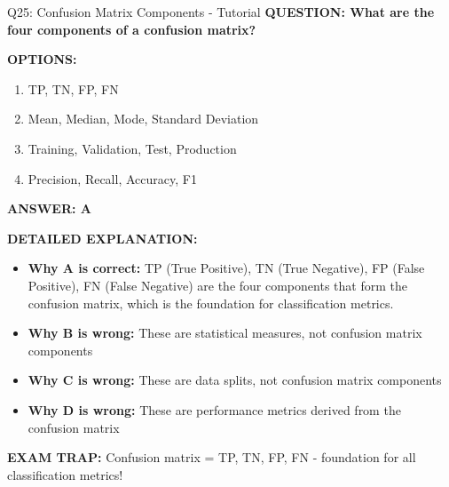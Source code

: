 \documentclass[8pt]{beamer}
\begin{document}
	\begin{frame}{Q25: Confusion Matrix Components - Tutorial}
		\fontsize{6.5}{7.5}\selectfont
		\textbf{QUESTION: What are the four components of a confusion matrix?}
		
		\vspace{0.1cm}
		\textbf{OPTIONS:}
		\begin{enumerate}
			\item TP, TN, FP, FN
			\item Mean, Median, Mode, Standard Deviation
			\item Training, Validation, Test, Production
			\item Precision, Recall, Accuracy, F1
		\end{enumerate}
		
		\vspace{0.1cm}
		\textcolor{myblue}{\textbf{ANSWER: A}}
		
		\vspace{0.1cm}
		\textbf{DETAILED EXPLANATION:}
		\begin{itemize}
			\item \textbf{Why A is correct:} TP (True Positive), TN (True Negative), FP (False Positive), FN (False Negative) are the four components that form the confusion matrix, which is the foundation for classification metrics.
			\item \textbf{Why B is wrong:} These are statistical measures, not confusion matrix components
			\item \textbf{Why C is wrong:} These are data splits, not confusion matrix components
			\item \textbf{Why D is wrong:} These are performance metrics derived from the confusion matrix
		\end{itemize}
		
		\textcolor{myred}{\textbf{EXAM TRAP:}} Confusion matrix = \textcolor{myblue}{TP, TN, FP, FN} - foundation for all classification metrics!
	\end{frame}
	
\end{document}
